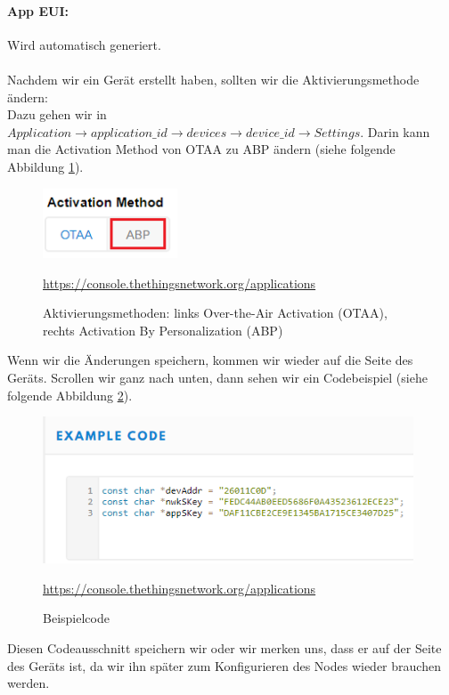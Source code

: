 \paragraph{App EUI:} Wird automatisch generiert.\\
\\
Nachdem wir ein Gerät erstellt haben, sollten wir die Aktivierungsmethode ändern:\\
Dazu gehen wir in $Application \rightarrow application\_id \rightarrow devices \rightarrow device\_id \rightarrow Settings$. Darin kann man die Activation Method von OTAA zu ABP ändern (siehe folgende Abbildung \ref{fig:lora-6}).
\begin{figure}[H]
    \center
    \includegraphics[width=4cm]{Bilder/lora-6.png}\\
    \caption{Aktivierungsmethoden: links Over-the-Air Activation (OTAA), rechts Activation By Personalization (ABP)}
    \begin{center} \quelle\url{https://console.thethingsnetwork.org/applications} \end{center}
    \label{fig:lora-6}
\end{figure}
\noindent
Wenn wir die Änderungen speichern, kommen wir wieder auf die Seite des Geräts. Scrollen wir ganz nach unten, dann sehen wir ein Codebeispiel (siehe folgende Abbildung \ref{fig:beispielcode}).
\begin{figure}[H]
    \center
    \includegraphics[width=11cm]{Bilder/lora-7.png}\\
    \caption{Beispielcode}
    \begin{center} \quelle\url{https://console.thethingsnetwork.org/applications} \end{center}
    \label{fig:beispielcode}
\end{figure}
\noindent
Diesen Codeausschnitt speichern wir oder wir merken uns, dass er auf der Seite des Geräts ist, da wir ihn später zum Konfigurieren des Nodes wieder brauchen werden. 
